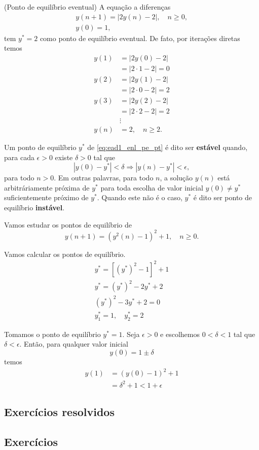 \begin{ex}(Ponto de equilíbrio eventual)
  A equação a diferenças
  \begin{align}
    y(n+1) = |2y(n)-2|,\quad n\geq 0,\\
    y(0) = 1,
  \end{align}
  tem $y^* = 2$ como ponto de equilíbrio eventual. De fato, por iterações diretas temos
  \begin{align}
    y(1) &= |2y(0)-2| \\
         &= |2\cdot 1 - 2| = 0 \\
    y(2) &= |2y(1)-2| \\
         &= |2\cdot 0 - 2| = 2 \\
    y(3) &= |2y(2) - 2| \\
         &= |2\cdot 2 - 2| = 2 \\
         &\vdots \\
    y(n) &= 2,\quad n\geq 2.
  \end{align}
\end{ex}

Um ponto de equilíbrio $y^*$ de \eqref{eq:ead1_enl_pe_pt} é dito ser {\bf estável} quando, para cada $\epsilon>0$ existe $\delta>0$ tal que
\begin{equation}
  |y(0)-y^*|<\delta \Rightarrow |y(n)-y^*|<\epsilon,
\end{equation}
para todo $n>0$. Em outras palavras, para todo $n$, a solução $y(n)$ está arbitráriamente próxima de $y^*$ para toda escolha de valor inicial $y(0)\neq y^*$ suficientemente próximo de $y^*$. Quando este não é o caso, $y^*$ é dito ser ponto de equilíbrio {\bf instável}.

\begin{ex}
  Vamos estudar os pontos de equilíbrio de
  \begin{equation}
    y(n+1) = \left(y^2(n)-1\right)^2 + 1,\quad n\geq 0.
  \end{equation}

  Vamos calcular os pontos de equilíbrio.
  \begin{gather}
    y^* = \left[\left(y^*\right)^2-1\right]^2 + 1 \\
    y^* = \left(y^*\right)^2 - 2y^* + 2 \\
    \left(y^*\right)^2 - 3y^* + 2 = 0 \\
    y_1^* = 1,\quad y_2^* = 2
  \end{gather}

  Tomamos o ponto de equilíbrio $y^*=1$. Seja $\epsilon > 0$ e escolhemos $0<\delta<1$ tal que $\delta<\epsilon$. Então, para qualquer valor inicial
  \begin{equation}
    y(0) = 1 \pm \delta
  \end{equation}
  temos
  \begin{align}
    y(1) &= \left(y(0)-1\right)^2+1\\
         &= \delta^2 + 1 < 1 + \epsilon
  \end{align}
\end{ex}

\subsection*{Exercícios resolvidos}

\emconstrucao

\subsection*{Exercícios}

\emconstrucao
